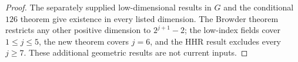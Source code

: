\begin{proof}
  The separately supplied low-dimensional results in $G$ and the conditional
  $126$ theorem give existence in every listed dimension. The Browder theorem
  restricts any other positive dimension to $2^{j+1}-2$; the low-index fields
  cover $1\le j\le5$, the new theorem covers $j=6$, and the HHR result excludes
  every $j\ge7$. These additional geometric results are not current inputs.
\end{proof}

